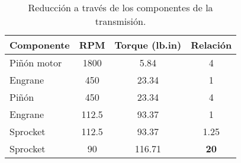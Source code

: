 \begin{table}[h]
\centering
\begin{tabular}{@{}lccc@{}}
\toprule
\textbf{Componente} & \multicolumn{1}{l}{\textbf{RPM}} & \multicolumn{1}{l}{\textbf{Torque (lb.in)}} & \multicolumn{1}{l}{\textbf{Relación}} \\ \midrule
Piñón motor         & 1800                             & 5.84                                        & 4                                     \\
Engrane             & 450                              & 23.34                                       & 1                                     \\
Piñón               & 450                              & 23.34                                       & 4                                     \\
Engrane             & 112.5                            & 93.37                                       & 1                                     \\
Sprocket            & 112.5                            & 93.37                                       & 1.25                                  \\
Sprocket            & 90                               & 116.71                                      & \textbf{20}                           \\ \bottomrule
\end{tabular}
\caption{Reducción a través de los componentes de la transmisión.}
\label{tab:reduccion}
\end{table}

